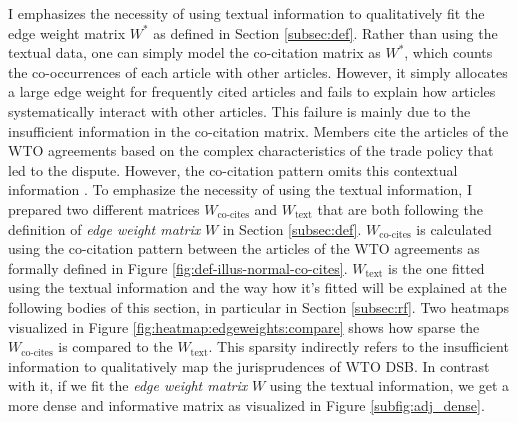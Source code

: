 I emphasizes the necessity of using textual information
to qualitatively fit the edge weight matrix $W^*$ as defined in Section \ref{subsec:def}. 
Rather than using the textual data, one can simply model the co-citation matrix as $W^*$, which counts the co-occurrences of each article with other articles.
However, it simply allocates a large edge weight for frequently cited articles and fails to explain how articles systematically interact with other articles.
This failure is mainly due to the insufficient information in the co-citation matrix. Members cite the articles of
the WTO agreements based on the complex characteristics of
the trade policy that led to the dispute. 
However, the co-citation pattern omits this contextual information . To emphasize the necessity of using the textual information, I prepared two different matrices $W_{\text{co-cites}}$ and $W_{\text{text}}$ that are both following the definition of \textit{edge weight matrix} $W$ in Section \ref{subsec:def}.
$W_{\text{co-cites}}$ is calculated using the co-citation pattern between the articles of the WTO agreements as formally defined
in Figure %
\ref{fig:def-illus-normal-co-cites}.
$W_{\text{text}}$ is the one fitted using the textual information and the way how it's fitted will be explained at the following bodies of this section, in particular in Section \ref{subsec:rf}.
Two heatmaps visualized in Figure \ref{fig:heatmap:edgeweights:compare} shows how sparse the $W_{\text{co-cites}}$ is compared to the $W_{\text{text}}$. This sparsity indirectly refers to the insufficient information
to qualitatively map the jurisprudences of WTO DSB.
In contrast with it, if we fit the \textit{edge weight matrix} $W$ using the textual information, we get a more dense and informative matrix as visualized in Figure \ref{subfig:adj_dense}.

